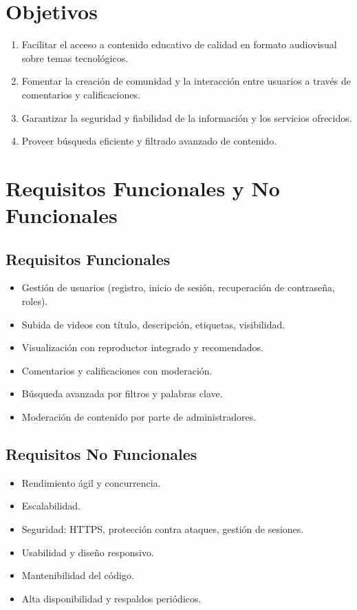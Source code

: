 \documentclass[12pt]{article}
\begin{document}
\section{Objetivos}
\begin{enumerate}
  \item Facilitar el acceso a contenido educativo de calidad en formato audiovisual sobre temas tecnológicos.
  \item Fomentar la creación de comunidad y la interacción entre usuarios a través de comentarios y calificaciones.
  \item Garantizar la seguridad y fiabilidad de la información y los servicios ofrecidos.
  \item Proveer búsqueda eficiente y filtrado avanzado de contenido.
\end{enumerate}

\section{Requisitos Funcionales y No Funcionales}
\subsection*{Requisitos Funcionales}
\begin{itemize}[leftmargin=*]
  \item Gestión de usuarios (registro, inicio de sesión, recuperación de contraseña, roles).
  \item Subida de videos con título, descripción, etiquetas, visibilidad.
  \item Visualización con reproductor integrado y recomendados.
  \item Comentarios y calificaciones con moderación.
  \item Búsqueda avanzada por filtros y palabras clave.
  \item Moderación de contenido por parte de administradores.
\end{itemize}

\subsection*{Requisitos No Funcionales}
\begin{itemize}[leftmargin=*]
  \item Rendimiento ágil y concurrencia.
  \item Escalabilidad.
  \item Seguridad: HTTPS, protección contra ataques, gestión de sesiones.
  \item Usabilidad y diseño responsivo.
  \item Mantenibilidad del código.
  \item Alta disponibilidad y respaldos periódicos.
\end{itemize}
\end{document}
